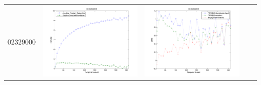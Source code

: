 \documentclass[11pt]{article}
\begin{document}
\begin{table}[H]
{\begin{tabular}{c  c   c   c  c }
02329000&\begin{minipage}{.4\textwidth}\includegraphics[width=\linewidth]{resultgraph/02329000e.png}\end{minipage}
&\begin{minipage}{.4\textwidth}\includegraphics[width=\linewidth]{resultgraph/02329000MI.png}\end{minipage}

\end{tabular}}
\end{table}
\end{document}
